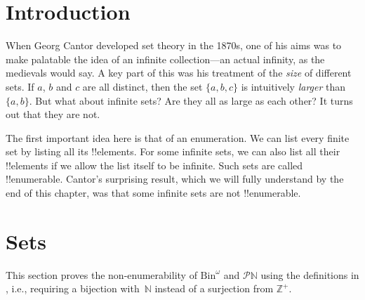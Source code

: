 \documentclass[10pt,a4paper]{article}
\makeatletter
\theoremstyle{plain}
\theoremstyle{definition}
\theoremstyle{remark}
\newenvironment{editorial}{}{}
\newcommand*{\olfileid}[3]{}
\newcommand*{\olsection}[1]{\section*{#1}}
\newcommand{\olref}{\@ifnextchar[{\olref@i}{\olref@final}}
\def\olref@i[#1]{\@ifnextchar[{\olref@ii}{\olref@final}}
\def\olref@ii[#1]{\@ifnextchar[{\olref@iii}{\olref@final}}
\def\olref@iii[#1]{\olref@final}
\def\olref@final#1{\ref{#1}}
\providecommand{\Nat}{\ensuremath{\mathbb{N}}}
\providecommand{\PosInt}{\mathbb{Z}^{+}}
\providecommand{\Bin}{\mathrm{Bin}}
\providecommand{\Pow}{\mathcal{P}}
\makeatother
\begin{document}



\olfileid{sfr}{siz}{int}

\olsection{Introduction}

When Georg Cantor developed set theory in the 1870s, one of his aims
was to make palatable the idea of an infinite collection---an actual
infinity, as the medievals would say.  A key part of this was his
treatment of the \emph{size} of different sets. If $a$, $b$ and $c$ are
all distinct, then the set $\{a, b, c\}$ is intuitively \emph{larger}
than $\{a, b\}$. But what about infinite sets? Are they all as large
as each other? It turns out that they are not.

The first important idea here is that of an enumeration.  We can
list every finite set by listing all its !!{element}s.  For some
infinite sets, we can also list all their !!{element}s if we allow the
list itself to be infinite. Such sets are called !!{enumerable}.
Cantor's surprising result, which we will fully understand by the end
of this chapter, was that some infinite sets are not !!{enumerable}.





\olfileid{sfr}{siz}{nen-alt}

\olsection{ Sets}

\begin{editorial}
  This section proves the non-enumerability of $\Bin^\omega$ and
  $\Pow{\Nat}$ using the definitions in \olref[enm-alt]{sec}, i.e.,
  requiring a bijection with~$\Nat$ instead of a surjection from
  $\PosInt$.
\end{editorial}
\end{document}
